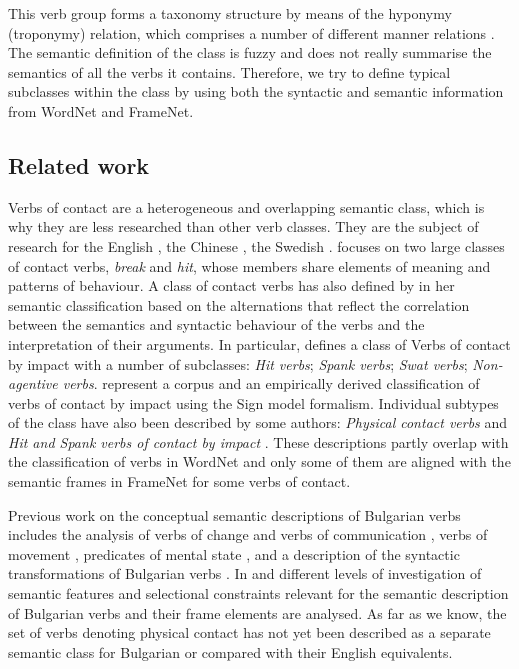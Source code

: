 \documentclass[output=paper,colorlinks,citecolor=brown]{langscibook}
\begin{document}
This verb group forms a taxonomy structure by means of the hyponymy (troponymy) relation, which comprises a number of different manner relations \citep{Fellbaum:90}. The semantic definition of the class is fuzzy and does not really summarise the semantics of all the verbs it contains. Therefore, we try to define typical subclasses within the class by using both the syntactic and semantic information from WordNet and FrameNet.

\subsection{Related work}
Verbs of contact are a heterogeneous and overlapping semantic class, which is why they are less researched than other verb classes. They are the subject of research for the English \citep{Fillmore:70, Levin:93, Fellbaum:90}, the Chinese \citep{GaoCheng:03}, the Swedish \citep{Viberg2004}. \citet{Fillmore:70} focuses on two large classes of contact verbs, \textit{break} and \textit{hit}, whose members share elements of meaning and patterns of behaviour. A class of contact verbs has also defined by \citet{Levin:93} in her semantic classification based on the alternations that reflect the correlation between the semantics and syntactic behaviour of the verbs and the interpretation of their arguments. In particular, \citet[148-156]{Levin:93} defines a class of Verbs of contact by impact with a number of subclasses: \textit{Hit verbs}; \textit{Spank verbs}; \textit{Swat verbs}; \textit{Non-agentive verbs}. \citet{VulchanovaDekova:09} represent a corpus and an empirically derived classification of verbs of contact by impact using the Sign model formalism. Individual subtypes of the class have also been described by some authors: \textit{Physical contact verbs} \citep{Gao:01} and \textit{Hit and Spank verbs of contact by impact} \citep{GaoCheng:03}. These descriptions partly overlap with the classification of verbs in WordNet and only some of them are aligned with the semantic frames in FrameNet for some verbs of contact.

Previous work on the conceptual semantic descriptions of Bulgarian verbs includes the analysis of verbs of change \citep{StoyanovaLeseva:21a} and verbs of communication \citep{Kukova:21}, verbs of movement \citep{Kostova2010}, predicates of mental state \citep{Stamenov2021, Stamenov2022, Tisheva2021, Dzhonova2008}, and a description of the syntactic transformations of Bulgarian verbs \citep{Koeva2004, Koeva2021zv, Koeva:2022}. In \citet{Lesevaetal:20b} and \citet{Lesevaetal:2019} different levels of investigation of semantic features and selectional constraints relevant for the semantic description of Bulgarian verbs and their frame elements are analysed. As far as we know, the set of verbs denoting physical contact has not yet been described as a separate semantic class for Bulgarian or compared with their English equivalents.
\end{document}
